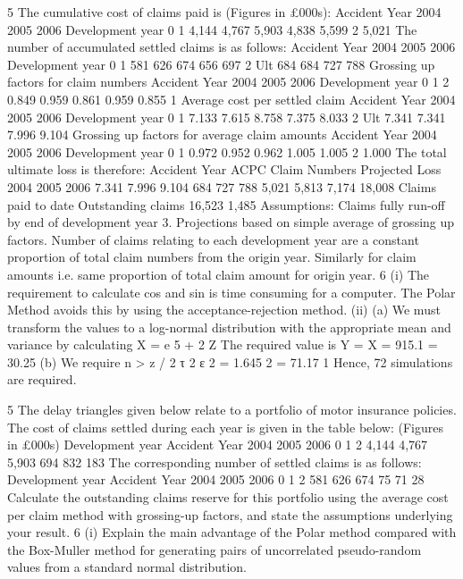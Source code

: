 \documentclass[a4paper,12pt]{article}
\begin{document}
\begin{enumerate}

5
The cumulative cost of claims paid is (Figures in £000s):
Accident Year
2004
2005
2006
Development year
0
1
4,144
4,767
5,903
4,838
5,599
2
5,021
The number of accumulated settled claims is as follows:
Accident Year
2004
2005
2006
Development year
0
1
581
626
674
656
697
2 Ult
684 684
727
788
Grossing up factors for claim numbers
Accident Year
2004
2005
2006
Development year
0
1
2
0.849 0.959
0.861 0.959
0.855
1
Average cost per settled claim
Accident Year
2004
2005
2006
Development year
0
1
7.133
7.615
8.758
7.375
8.033
2 Ult
7.341 7.341
7.996
9.104
Grossing up factors for average claim amounts
Accident Year
2004
2005
2006
Development year
0
1
0.972
0.952
0.962
1.005
1.005
2
1.000
The total ultimate loss is therefore:
Accident Year ACPC Claim
Numbers Projected
Loss
2004
2005
2006 7.341
7.996
9.104 684
727
788 5,021
5,813
7,174
18,008
Claims paid to date
Outstanding claims
16,523
1,485
Assumptions:
Claims fully run-off by end of development year 3.
Projections based on simple average of grossing up factors.
Number of claims relating to each development year are a constant proportion of total
claim numbers from the origin year.
Similarly for claim amounts i.e. same proportion of total claim amount for origin year.
6
(i) The requirement to calculate cos and sin is time consuming for a computer.
The Polar Method avoids this by using the acceptance-rejection method.
(ii) (a)
We must transform the values to a log-normal distribution with the
appropriate mean and variance by calculating
X = e 5 + 2 Z
The required value is Y = X = 915.1 = 30.25
(b)
We require n >
z  / 2 τ 2
ε 2
=
1.645 2 
= 71.17
1
Hence, 72 simulations are required.


5
The delay triangles given below relate to a portfolio of motor insurance policies.
The cost of claims settled during each year is given in the table below:
(Figures in £000s)
Development year
Accident
Year
2004
2005
2006
0 1 2
4,144
4,767
5,903 694
832 183
The corresponding number of settled claims is as follows:
Development year
Accident
Year
2004
2005
2006
0 1 2
581
626
674 75
71 28
Calculate the outstanding claims reserve for this portfolio using the average cost per claim method with grossing-up factors, and state the assumptions underlying your result.
6
(i) Explain the main advantage of the Polar method compared with the Box-Muller method for generating pairs of uncorrelated pseudo-random values from a standard normal distribution.


\end{enumerate}
\end{document}
